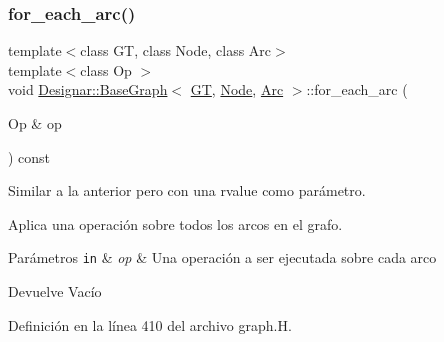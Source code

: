 \subsubsection{\texorpdfstring{for\+\_\+each\+\_\+arc()}{for\_each\_arc()}\hspace{0.1cm}{\footnotesize\ttfamily [1/2]}}
{\footnotesize\ttfamily template$<$class GT, class Node, class Arc$>$ \\
template$<$class Op $>$ \\
void \hyperlink{class_designar_1_1_base_graph}{Designar\+::\+Base\+Graph}$<$ \hyperlink{demo-buildgraph_8_c_a3001c40d2c31ca87ed96cd7d1334a55e}{GT}, \hyperlink{namespace_designar_a5af326c65aa2bd26b26c410f2030d09e}{Node}, \hyperlink{namespace_designar_a3f55fb5513d62ff47cbc8f72b8e95d6f}{Arc} $>$\+::for\+\_\+each\+\_\+arc (\begin{DoxyParamCaption}\item[{Op \&}]{op }\end{DoxyParamCaption}) const\hspace{0.3cm}{\ttfamily [inline]}}



Similar a la anterior pero con una rvalue como parámetro. 

Aplica una operación sobre todos los arcos en el grafo.


\begin{DoxyParams}[1]{Parámetros}
\mbox{\tt in}  & {\em op} & Una operación a ser ejecutada sobre cada arco \\
\hline
\end{DoxyParams}
\begin{DoxyReturn}{Devuelve}
Vacío 
\end{DoxyReturn}


Definición en la línea 410 del archivo graph.\+H.

\mbox{\label{class_designar_1_1_base_graph_ae76905d5baebd62d0fc481efc7c20f66}} 
